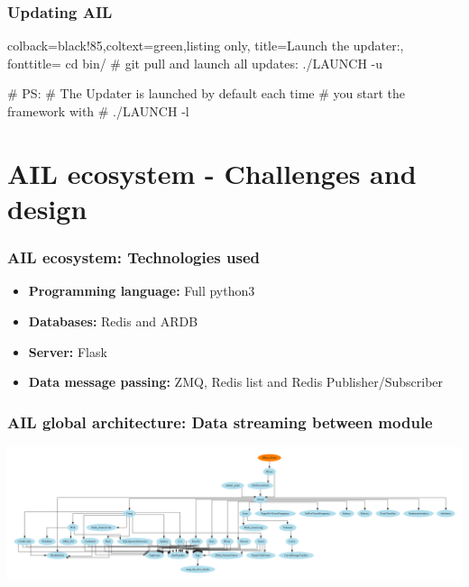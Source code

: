 \documentclass{beamer}
\begin{document}
\begin{frame}[fragile]
    \frametitle{Updating AIL}
    \begin{tcblisting}{colback=black!85,coltext=green,listing only,
        title=Launch the updater:, fonttitle=\bfseries}
cd bin/
# git pull and launch all updates:
./LAUNCH -u


# PS:
# The Updater is launched by default each time
# you start the framework with
# ./LAUNCH -l
\end{tcblisting}

\end{frame}


\section{AIL ecosystem - Challenges and design}
\begin{frame}
    \frametitle{AIL ecosystem: Technologies used}
    \begin{itemize}
        \item[] \textbf{Programming language:} Full python3
        \item[] \textbf{Databases:} Redis and ARDB
        \item[] \textbf{Server:} Flask
        \item[] \textbf{Data message passing:} ZMQ, Redis list and Redis Publisher/Subscriber
    \end{itemize}
\end{frame}


\begin{frame}
    \frametitle{AIL global architecture: Data streaming between module}
    \centerline{\includegraphics[scale=0.15]{images/module-data-flow.png}}
\end{frame}
\end{document}
